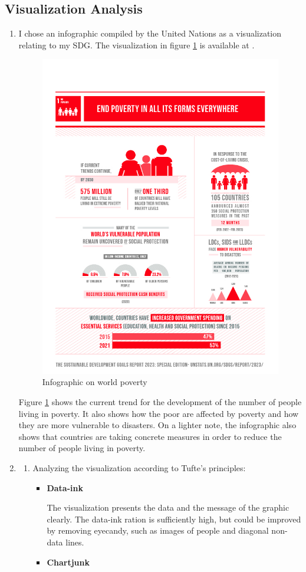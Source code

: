 \documentclass[11pt,a4paper,titlepage]{article}
\begin{document}
\subsection{Visualization Analysis}
\begin{enumerate}
    \item I chose an infographic compiled by the United Nations as a visualization relating to my SDG. The visualization in figure \ref{fig:viz} is available at \cite{vizpov}.
    
    \begin{figure}[h]
        \centering
        \includegraphics[width=0.4\linewidth]{reports/assignment-1/imgs/task2.jpg}
        \caption{Infographic on world poverty}
        \label{fig:viz}
    \end{figure}

    Figure \ref{fig:viz} shows the current trend for the development of the number of people living in poverty. It also shows how the poor are affected by poverty and how they are more vulnerable to disasters. On a lighter note, the infographic also shows that countries are taking concrete measures in order to reduce the number of people living in poverty.
    
    \item \begin{enumerate}
        \item Analyzing the visualization according to Tufte's principles:
        \begin{itemize}
            \item \textbf{Data-ink}
            
            The visualization presents the data and the message of the graphic clearly. The data-ink ration is sufficiently high, but could be improved by removing eyecandy, such as images of people and diagonal non-data lines.
            \item \textbf{Chartjunk}
            

\end{itemize}
\end{enumerate}
\end{enumerate}
\end{document}
